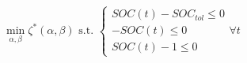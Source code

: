 \begin{equation}
	\min_{\alpha,\beta} \zeta^*(\alpha, \beta) \text{ s.t. }
	\begin{cases}
		SOC(t) - SOC_{tol} \leq 0\\
		-SOC(t) \leq 0\\
		SOC(t) - 1 \leq 0
	\end{cases}
	\forall t
	\label{ch2:equ:cost-weights}
\end{equation}